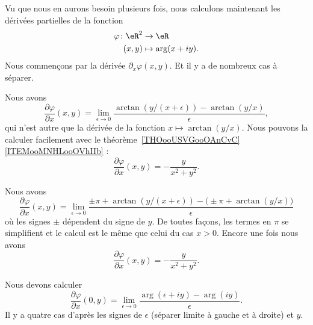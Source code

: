 \begin{normaltext}     \label{NORMooMRBEooVtTcIA}
	Vu que nous en aurons besoin plusieurs fois, nous calculons maintenant les dérivées partielles de la fonction
	\begin{equation}
		\begin{aligned}
			\varphi\colon \eR^2 & \to \eR             \\
			(x,y)               & \mapsto \arg(x+iy).
		\end{aligned}
	\end{equation}
	Nous commençons par la dérivée \( \partial_x\varphi(x,y)\). Et il y a de nombreux cas à séparer.
	\begin{subproof}

		\spitem[\( x>0\)]

		Nous avons
		\begin{equation}
			\frac{ \partial \varphi }{ \partial x }(x,y)=\lim_{\epsilon\to 0}\frac{ \arctan(y/(x+\epsilon))-\arctan(y/x) }{ \epsilon },
		\end{equation}
		qui n'est autre que la dérivée de la fonction \( x\mapsto\arctan(y/x)\). Nous pouvons la calculer facilement avec le théorème~\ref{THOooUSVGooOAnCvC}\ref{ITEMooMNHLooOVhIIb} :
		\begin{equation}
			\frac{ \partial \varphi }{ \partial x }(x,y)=-\frac{ y }{ x^2+y^2 }.
		\end{equation}

		\spitem[\( x<0\)]

		Nous avons
		\begin{equation}
			\frac{ \partial \varphi }{ \partial x }(x,y)=\lim_{\epsilon\to 0}\frac{ \pm\pi+\arctan(y/(x+\epsilon))-\big( \pm\pi+\arctan(y/x) \big) }{ \epsilon }
		\end{equation}
		où les signes \( \pm\) dépendent du signe de \( y\). De toutes façons, les termes en \( \pi\) se simplifient et le calcul est le même que celui du cas \( x>0\). Encore une fois nous avons
		\begin{equation}
			\frac{ \partial \varphi }{ \partial x }(x,y)=-\frac{ y }{ x^2+y^2 }.
		\end{equation}

		\spitem[\( x=0\)]

		Nous devons calculer
		\begin{equation}
			\frac{ \partial \varphi }{ \partial x }(0,y)=\lim_{\epsilon\to 0}\frac{ \arg(\epsilon+ iy)-\arg(iy) }{ \epsilon }.
		\end{equation}
		Il y a quatre cas d'après les signes de \( \epsilon\) (séparer limite à gauche et à droite) et \( y\).


\end{subproof}
\end{normaltext}
